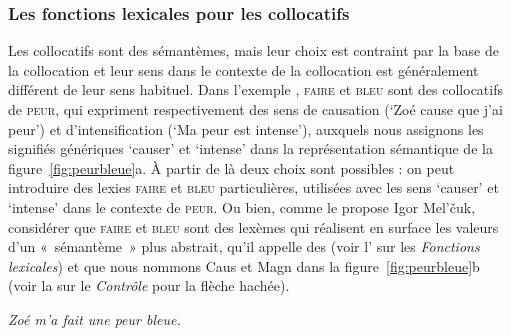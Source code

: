 \subsubsection{Les fonctions lexicales pour les collocatifs}
Les collocatifs sont des sémantèmes, mais leur choix est contraint par la base de la collocation et leur sens dans le contexte de la collocation est généralement différent de leur sens habituel. Dans l’exemple , \textsc{faire} et \textsc{bleu} sont des collocatifs de \textsc{peur}, qui expriment respectivement des sens de causation (‘Zoé cause que j’ai peur’) et d’intensification (‘Ma peur est intense’), auxquels nous assignons les signifiés génériques ‘causer’ et ‘intense’ dans la représentation sémantique de la figure~\ref{fig:peurbleue}a. À partir de là deux choix sont possibles : on peut introduire des lexies \textsc{faire} et \textsc{bleu} particulières, utilisées avec les sens ‘causer’ et ‘intense’ dans le contexte de \textsc{peur}. Ou bien, comme le propose Igor Mel’čuk, considérer que \textsc{faire} et \textsc{bleu} sont des lexèmes qui réalisent en surface les valeurs d’un «~sémantème~» plus abstrait, qu’il appelle des  (voir l' sur les \textit{Fonctions lexicales}) et que nous nommons Caus et Magn dans la figure~\ref{fig:peurbleue}b (voir la  sur le \textit{Contrôle} pour la flèche hachée).

\ea\label{ex:peurbleue} \textit{Zoé m’a fait une peur bleue.}\z


